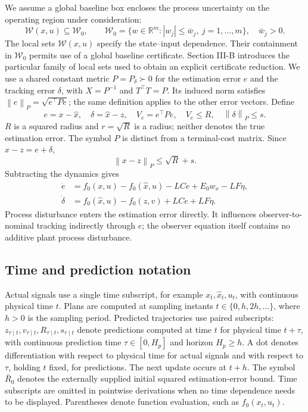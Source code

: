 \documentclass[11pt,a4paper]{article}
\numberwithin{equation}{section}
\theoremstyle{remark}\newtheorem{remark}{Remark}
\newcommand{\R}{\mathbb R}
\newcommand{\norm}[1]{\left\lVert#1\right\rVert}
\newcommand{\cW}{\mathcal W}
\begin{document}
We assume a global baseline box encloses the process uncertainty on the operating region under consideration:
\[
\mathcal W(x,u)\subseteq\cW_0,
\qquad
\cW_0=\{w\in\R^m:|w_j|\le\bar w_j,\ j=1,\ldots,m\},\quad\bar w_j>0.
\]
The local sets $\mathcal W(x,u)$ specify the state--input dependence. Their containment in $\cW_0$ permits use of a global baseline certificate. Section III-B introduces the particular family of local sets used to obtain an explicit certificate reduction.
We use a shared constant metric $P=P_\delta\succ0$ for the estimation error $e$ and the tracking error $\delta$, with $X=P^{-1}$ and $T^\top T=P$. Its induced norm satisfies $\norm e_P=\sqrt{e^\top Pe}$; the same definition applies to the other error vectors. Define
\begin{equation}
e=x-\hat x,\quad \delta=\hat x-z,\quad V_e=e^\top Pe,\quad
V_e\le R,\quad \norm{\delta}_P\le s.
\end{equation}
$R$ is a squared radius and $r=\sqrt R$ is a radius; neither denotes the true estimation error. The symbol $P$ is distinct from a terminal-cost matrix. Since $x-z=e+\delta$,
\begin{equation}\label{eq:total}
\norm{x-z}_P\le\sqrt R+s.
\end{equation}
Subtracting the dynamics gives
\begin{subequations}\label{eq:errors}
\begin{align}
\dot e&=f_0(x,u)-f_0(\hat x,u)-LCe+E_0w_x-LF\eta,\\
\dot\delta&=f_0(\hat x,u)-f_0(z,v)+LCe+LF\eta.
\end{align}
\end{subequations}
Process disturbance enters the estimation error directly. It influences observer-to-nominal tracking indirectly through $e$; the observer equation itself contains no additive plant process disturbance.

\subsection{Time and prediction notation}
Actual signals use a single time subscript, for example $x_t,\hat x_t,u_t$, with continuous physical time $t$. Plans are computed at sampling instants $t\in\{0,h,2h,\ldots\}$, where $h>0$ is the sampling period. Predicted trajectories use paired subscripts: $z_{\tau\mid t},v_{\tau\mid t},R_{\tau\mid t},s_{\tau\mid t}$ denote predictions computed at time $t$ for physical time $t+\tau$, with continuous prediction time $\tau\in[0,H_p]$ and horizon $H_p\ge h$. A dot denotes differentiation with respect to physical time for actual signals and with respect to $\tau$, holding $t$ fixed, for predictions. The next update occurs at $t+h$. The symbol $\bar R_0$ denotes the externally supplied initial squared estimation-error bound. Time subscripts are omitted in pointwise derivations when no time dependence needs to be displayed. Parentheses denote function evaluation, such as $f_0(x_t,u_t)$.
\end{document}
